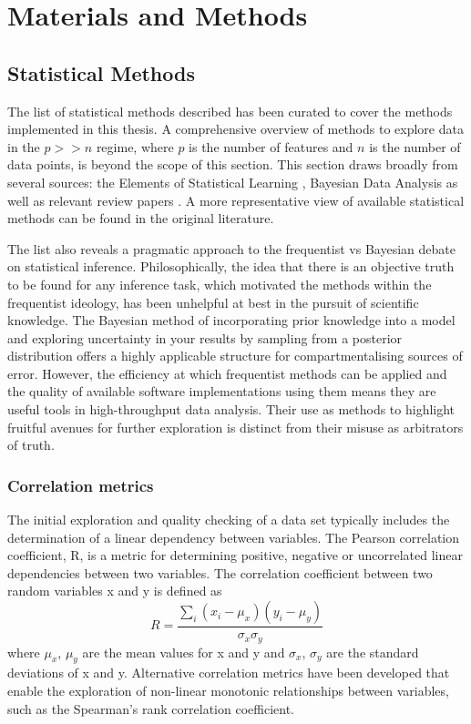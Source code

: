 \documentclass[../main.tex]{subfiles}
\begin{document}
\chapter{Materials and Methods}

\section{Statistical Methods}

The list of statistical methods described has been curated to cover the methods implemented in this thesis.
A comprehensive overview of methods to explore data in the $p >> n$ regime, where $p$ is the number of features and $n$ is the number of data points, is beyond the scope of this section.
This section draws broadly from several sources: the Elements of Statistical Learning \parencite{Hastie2009}, Bayesian Data Analysis \parencite{Gelman2014} as well as relevant review papers \parencite{Greener2021, Wu2015}.
A more representative view of available statistical methods can be found in the original literature.

The list also reveals a pragmatic approach to the frequentist vs Bayesian debate on statistical inference.
Philosophically, the idea that there is an objective truth to be found for any inference task, which motivated the methods within the frequentist ideology, has been unhelpful at best in the pursuit of scientific knowledge.
The Bayesian method of incorporating prior knowledge into a model and exploring uncertainty in your results by sampling from a posterior distribution offers a highly applicable structure for compartmentalising sources of error.
However, the efficiency at which frequentist methods can be applied and the quality of available software implementations using them means they are useful tools in high-throughput data analysis.
Their use as methods to highlight fruitful avenues for further exploration is distinct from their misuse as arbitrators of truth. 

\subsection{Correlation metrics}

The initial exploration and quality checking of a data set typically includes the determination of a linear dependency between variables.
The Pearson correlation coefficient, R, is a metric for determining positive, negative or uncorrelated linear dependencies between two variables.
The correlation coefficient between two random variables x and y is defined as
$$R = \frac{\sum_i (x_i-\mu_x)(y_i-\mu_y)}{\sigma_x\sigma_y}$$
where $\mu_x$, $\mu_y$ are the mean values for x and y and $\sigma_x$, $\sigma_y$ are the standard deviations of x and y.
Alternative correlation metrics have been developed that enable the exploration of non-linear monotonic relationships between variables, such as the Spearman's rank correlation coefficient. 
\end{document}
